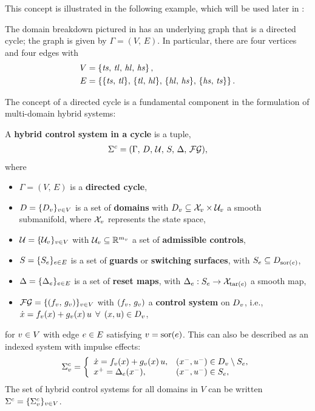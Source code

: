 This concept is illustrated in the following example, which will be used later
in :

\begin{exmp} \label{universalgraph}
  The domain breakdown pictured in  has an underlying
  graph that is a directed cycle;
  the graph is given by $\Gamma = (V, \, E)$.
  In particular, there are four vertices and four edges with
  \begin{align*}
    V &= \left\{\mathit{ts}, \, \mathit{tl}, \, \mathit{hl}, \, \mathit{hs}\right\},\\
    E &= \left\{\{\mathit{ts}, \, \mathit{tl}\}, \, \{\mathit{tl}, \, \mathit{hl}\}, \, \{\mathit{hl}, \, \mathit{hs}\}, \,
      \{\mathit{hs}, \, \mathit{ts}\}\right\}.
  \end{align*}
\end{exmp}

The concept of a directed cycle is a fundamental component in the formulation
of multi-domain hybrid systems:

\begin{definition} \label{def:hcs}
  A {\bf hybrid control system in a cycle} is a tuple,
  \begin{align*}
    \Sigma^{c} = (\Gamma, \, D, \, \mathcal{U}, \, S, \, \Delta, \, \mathcal{FG}),
  \end{align*}
  where
  \begin{itemize}
  \item $\Gamma = (V, \, E)$ is a {\bf directed cycle},
  \item $D = \{D_{v}\}_{v \in V}$ is a set of {\bf domains} with $D_{v}
    \subseteq \mathcal{X}_{v} \times \mathcal{U}_{v}$ a smooth submanifold, where $\mathcal{X}_{v}$ represents the
    state space,
  \item $\mathcal{U} = \{\mathcal{U}_{v}\}_{v \in V}$ with $\mathcal{U}_{v} \subseteq \mathbb{R}^{m_{v}}$ a set of
    {\bf admissible controls},
  \item $S = \{S_{e}\}_{e \in E}$ is a set of {\bf guards} or {\bf
      switching surfaces}, with $S_{e} \subseteq D_{\mathrm{sor}(e)}$,
  \item $\Delta = \{\Delta_{e}\}_{e \in E}$ is a set of {\bf reset maps}, with
    $\Delta_{e} : S_{e} \to \mathcal{X}_{\mathrm{tar}(e)}$ a smooth map,
  \item $\mathcal{FG} = \{(f_{v}, \, g_{v})\}_{v \in V}$ with $(f_{v}, \, g_{v})$ a {\bf control
      system} on $D_{v}$, i.e., ${\dot {x}} = f_{v}(x) + g_{v}(x) \, u$ $\forall$
    $(x, u) \in D_{v}$,
  \end{itemize}
  for $v \in V$ with edge $e \in E$ satisfying $v = \mathrm{sor}(e)$.
  This can also be described as an indexed system with impulse effects:
  \begin{align}
    \label{eq:HCSi}
    \Sigma^{c}_{v} = \left\{
      \begin{array}{l l}
        {\dot {x}} = f_{v}(x) + g_{v}(x) \, u, & (x^{-}, u^{-}) \in D_{v} \setminus
        S_{e},\\
        x^{+} = \Delta_{e}(x^{-}), & (x^{-}, u^{-}) \in S_{e},
      \end{array}\right.
  \end{align}
  The set of hybrid control systems for all domains in $V$ can be written $\Sigma^{c}
  = \{\Sigma^{c}_{v}\}_{v \in V}$.
\end{definition}


